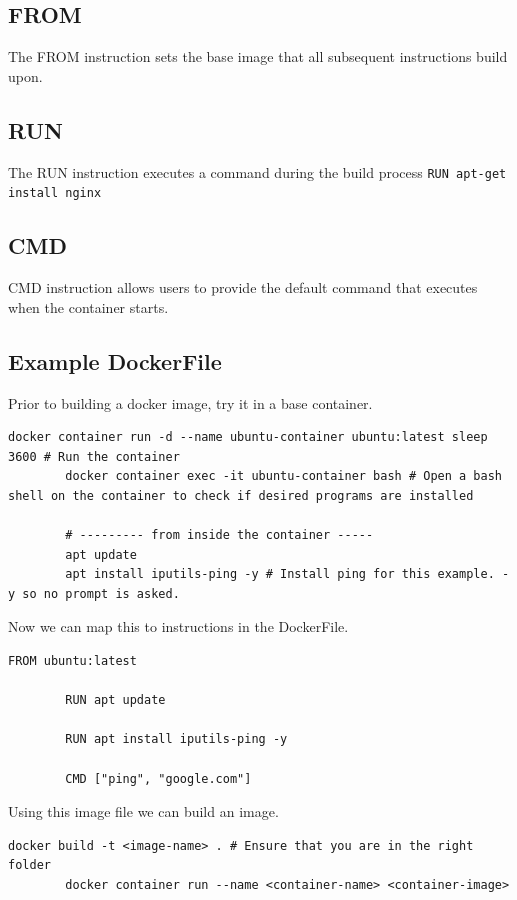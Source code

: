 \documentclass[11pt]{book}
\begin{document}
    \subsection{FROM}
    The FROM instruction sets the base image that all subsequent instructions build upon.

    \subsection{RUN}
    The RUN instruction executes a command during the build process
    \texttt{RUN apt-get install nginx}

    \subsection{CMD}

    CMD instruction allows users to provide the default command that executes when the container starts.

    \subsection{Example DockerFile}
    Prior to building a docker image, try it in a base container.

    \begin{lstlisting}[style=terminal]
        docker container run -d --name ubuntu-container ubuntu:latest sleep 3600 # Run the container
        docker container exec -it ubuntu-container bash # Open a bash shell on the container to check if desired programs are installed

        # --------- from inside the container -----
        apt update
        apt install iputils-ping -y # Install ping for this example. -y so no prompt is asked.
    \end{lstlisting}

    Now we can map this to instructions in the DockerFile.

    \begin{lstlisting}[style=dockerstyle,caption={Example Dockerfile}]
        FROM ubuntu:latest

        RUN apt update

        RUN apt install iputils-ping -y

        CMD ["ping", "google.com"]
    \end{lstlisting}

    Using this image file we can build an image.

    \begin{lstlisting}[style=terminal]
        docker build -t <image-name> . # Ensure that you are in the right folder
        docker container run --name <container-name> <container-image>
    \end{lstlisting}
\end{document}
